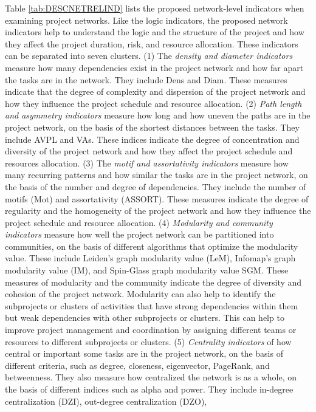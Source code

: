 \documentclass[preprint,
3p]{elsarticle} %
\begin{document}
Table \ref{tab:DESCNETRELIND} lists the proposed network-level
indicators when examining project networks. Like the logic indicators,
the proposed network indicators help to understand the logic and the
structure of the project and how they affect the project duration, risk,
and resource allocation. These indicators can be separated into seven
clusters. (1) The \emph{density and diameter indicators} measure how
many dependencies exist in the project network and how far apart the
tasks are in the network. They include Dens and Diam. These measures
indicate that the degree of complexity and dispersion of the project
network and how they influence the project schedule and resource
allocation. (2) \emph{Path length and asymmetry indicators} measure how
long and how uneven the paths are in the project network, on the basis
of the shortest distances between the tasks. They include AVPL and VAs.
These indices indicate the degree of concentration and diversity of the
project network and how they affect the project schedule and resources
allocation. (3) The \emph{motif and assortativity indicators} measure
how many recurring patterns and how similar the tasks are in the project
network, on the basis of the number and degree of dependencies. They
include the number of motifs (Mot) and assortativity (ASSORT). These
measures indicate the degree of regularity and the homogeneity of the
project network and how they influence the project schedule and resource
allocation. (4) \emph{Modularity and community indicators} measure how
well the project network can be partitioned into communities, on the
basis of different algorithms that optimize the modularity value. These
include Leiden's graph modularity value (LeM), Infomap's graph
modularity value (IM), and Spin-Glass graph modularity value SGM. These
measures of modularity and the community indicate the degree of
diversity and cohesion of the project network. Modularity can also help
to identify the subprojects or clusters of activities that have strong
dependencies within them but weak dependencies with other subprojects or
clusters. This can help to improve project management and coordination
by assigning different teams or resources to different subprojects or
clusters. (5) \emph{Centrality indicators} of how central or important
some tasks are in the project network, on the basis of different
criteria, such as degree, closeness, eigenvector, PageRank, and
betweenness. They also measure how centralized the network is as a
whole, on the basis of different indices such as alpha and power. They
include in-degree centralization (DZI), out-degree centralization (DZO),
\end{document}
